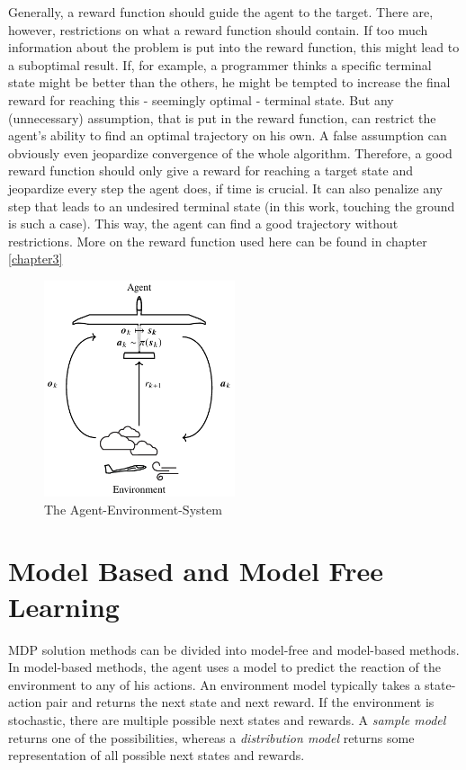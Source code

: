 Generally, a reward function should guide the agent to the target. There are, however, restrictions on what a reward function should contain. If too much information about the problem is put into the reward function, this might lead to a suboptimal result. If, for example, a programmer thinks a specific terminal state might be better than the others, he might be tempted to increase the final reward for reaching this - seemingly optimal - terminal state. But any (unnecessary) assumption, that is put in the reward function, can restrict the agent's ability to find an optimal trajectory on his own. A false assumption can obviously even jeopardize convergence of the whole algorithm. Therefore, a good reward function should only give a reward for reaching a target state and jeopardize every step the agent does, if time is crucial. It can also penalize any step that leads to an undesired terminal state (in this work, touching the ground is such a case). This way, the agent can find a good trajectory without restrictions. More on the reward function used here can be found in chapter \ref{chapter3} 

\begin{figure}[h]
	\centering
	\includegraphics[width=0.5\textwidth]{src/pics/RLProblem.pdf}
	\caption{The Agent-Environment-System \cite{Notter2018}}
	\label{fig:agent_env_system} 
\end{figure}

\section{Model Based and Model Free Learning}

MDP solution methods can be divided into model-free and model-based methods. In model-based methods, the agent uses a model to predict the reaction of the environment to any of his actions. An environment model typically takes a state-action pair and returns the next state and next reward. If the environment is stochastic, there are multiple possible next states and rewards. A \textit{sample model} returns one of the possibilities, whereas a \textit{distribution model} returns some representation of all possible next states and rewards.

